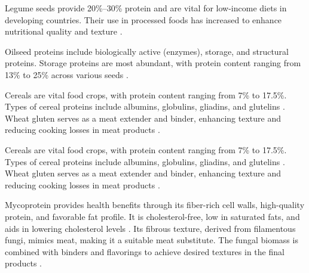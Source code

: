 Legume seeds provide 20\%–30\% protein and are vital for low-income diets in developing countries. Their use in processed foods has increased to enhance nutritional quality and texture \cite*{L12-MeatAna}.

Oilseed proteins include biologically active (enzymes), storage, and structural proteins. Storage proteins are most abundant, with protein content ranging from 13\% to 25\% across various seeds \cite*{L12-MeatAna}.

Cereals are vital food crops, with protein content ranging from 7\% to 17.5\%. Types of cereal proteins include albumins, globulins, gliadins, and glutelins \cite*{L12-MeatAna}. Wheat gluten serves as a meat extender and binder, enhancing texture and reducing cooking losses in meat products \cite*{L12-MeatAna}.

Cereals are vital food crops, with protein content ranging from 7\% to 17.5\%. Types of cereal proteins include albumins, globulins, gliadins, and glutelins \cite*{L12-MeatAna}. Wheat gluten serves as a meat extender and binder, enhancing texture and reducing cooking losses in meat products \cite*{L12-MeatAna}.

Mycoprotein provides health benefits through its fiber-rich cell walls, high-quality protein, and favorable fat profile. It is cholesterol-free, low in saturated fats, and aids in lowering cholesterol levels \cite*{L12-MeatAna}. Its fibrous texture, derived from filamentous fungi, mimics meat, making it a suitable meat substitute. The fungal biomass is combined with binders and flavorings to achieve desired textures in the final products \cite*{L12-MeatAna}.
